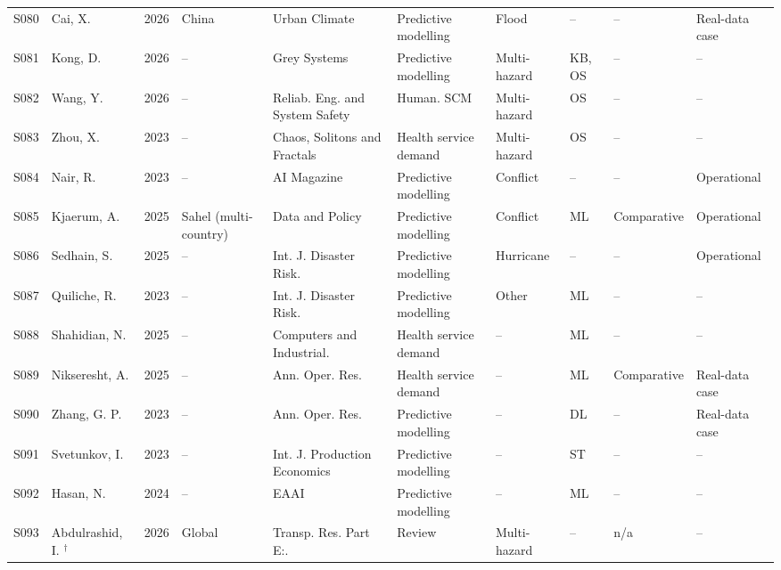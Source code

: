 \begin{landscape}
\begin{longtable}{@{}p{1.0cm}p{3.3cm}p{0.8cm}p{2.3cm}p{3.1cm}p{2.6cm}p{2.2cm}p{1.9cm}p{2.3cm}p{2.2cm}@{}}
S080 & Cai, X. \cite{Cai2026SpatialFloodSupplyDemand} & 2026 & China & Urban Climate & Predictive modelling & Flood & -- & -- & Real-data case \\
S081 & Kong, D. \cite{Kong2026GreyEmergencyMaterial} & 2026 & -- & Grey Systems & Predictive modelling & Multi-hazard & KB, OS & -- & -- \\
S082 & Wang, Y. \cite{Wang2026EmergencySuppliesScheduling} & 2026 & -- & Reliab. Eng. and System Safety & Human. SCM & Multi-hazard & OS & -- & -- \\
S083 & Zhou, X. \cite{Zhou2023AgentEmergencyMedical} & 2023 & -- & Chaos, Solitons and Fractals & Health service demand & Multi-hazard & OS & -- & -- \\
S084 & Nair, R. \cite{Nair2023ExplainableHumanitarianNeeds} & 2023 & -- & AI Magazine & Predictive modelling & Conflict & -- & -- & Operational \\
S085 & Kjaerum, A. \cite{Kjaerum2025DisplacementAnticipatory} & 2025 & Sahel (multi-country) & Data and Policy & Predictive modelling & Conflict & ML & Comparative & Operational \\
S086 & Sedhain, S. \cite{Sedhain2025ImpactBasedCycloneForecasting} & 2025 & -- & Int. J. Disaster Risk. & Predictive modelling & Hurricane & -- & -- & Operational \\
S087 & Quiliche, R. \cite{Quiliche2023ColdWaveRiskML} & 2023 & -- & Int. J. Disaster Risk. & Predictive modelling & Other & ML & -- & -- \\
S088 & Shahidian, N. \cite{Shahidian2025EMSDemandMachineLearning} & 2025 & -- & Computers and Industrial. & Health service demand & -- & ML & -- & -- \\
S089 & Nikseresht, A. \cite{Nikseresht2025BloodDemandEnsemble} & 2025 & -- & Ann. Oper. Res. & Health service demand & -- & ML & Comparative & Real-data case \\
S090 & Zhang, G. P. \cite{Zhang2023IntermittentTransformer} & 2023 & -- & Ann. Oper. Res. & Predictive modelling & -- & DL & -- & Real-data case \\
S091 & Svetunkov, I. \cite{Svetunkov2023IntermittentStateSpace} & 2023 & -- & Int. J. Production Economics & Predictive modelling & -- & ST & -- & -- \\
S092 & Hasan, N. \cite{Hasan2024SporadicKNNForecasting} & 2024 & -- & EAAI & Predictive modelling & -- & ML & -- & -- \\
S093 & Abdulrashid, I. \cite{Abdulrashid2026AIDecisionSupport}$^{\dagger}$ & 2026 & Global & Transp. Res. Part E:. & Review & Multi-hazard & -- & n/a & -- \\

\end{longtable}
\end{landscape}
